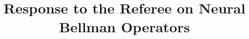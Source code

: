\documentclass[ecta,nameyear,draft]{econsocart}
\theoremstyle{definition}
\theoremstyle{remark}
\begin{document}
\begin{frontmatter}
\title{Response to the Referee on Neural Bellman Operators}
\begin{aug}
\author[id=au1,addressref={add1}]{~}
\address[id=add1]{Peking University}
\end{aug}
\end{frontmatter}

\end{document}
